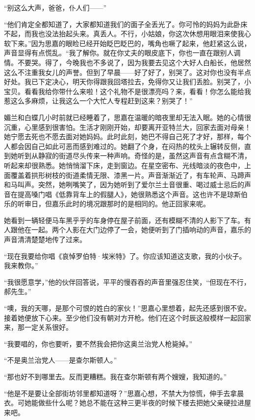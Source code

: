 \par “别这么大声，爸爸，仆人们——”
\par “他们肯定全都知道了，大家都知道我们的面子全丢光了。你可怜的妈妈为此卧床不起，而我也没法抬起头来。真丢人。不行，小姑娘，你这次休想用眼泪来使我心软下来。”因为思嘉的眼睑已经开始眨巴眨巴的，嘴角也噘了起来，他赶紧这么说，声音显得有点慌乱。“我了解你。就在你丈夫的眼皮底下，你也一直在跟别人调情。不要哭。得了，今晚我也不多说了，因为我要去见这个大好人白船长，他居然这么不注重我女儿的声誉。但到了早晨——好了好了，别哭了。这对你也没有半点好处。我已下定决心，明天你得跟我回塔拉去，免得你又让我们丢脸。别哭了，小宝贝。看看我给你带什么来啦！这个礼物不是很漂亮吗？来，看看！你怎么能给我惹这么多麻烦，让我这么一个大忙人专程赶到这来？别哭了！”
\par 
\par 媚兰和白蝶几小时前就已经睡着了，思嘉在温暖的暗夜里却无法入眠。她的心情很沉重，心里感到很害怕。生活才刚刚开始，却要离开亚特兰大，回家去面对母亲！她宁愿去死也不愿去面对她妈妈。此时此刻，她巴不得自己死了才好，那样，每个人都会因自己如此可恶而感到难过的。她翻了个身，在闷热的枕头上辗转反侧，直到她听到从静寂的街道尽头传来一种声响。奇怪的是，虽然这声音有点含糊不清，听起来却很熟悉。她悄悄溜下床，走到窗边。在星空密布、光线暗淡的夜色中，上面覆盖着拱形树枝的街道柔情无限、漆黑一片。声音渐渐近了，有车轮声、马蹄声和马叫声。突然，她咧嘴笑了，因为她听到了爱尔兰土音很重、喝过威士忌后的声音在提高嗓门唱《低靠背车上的假腿人》，她很熟悉这个声音。这也许不是琼斯伯乐的听审日，但嘉乐此时的境况跟那时的是相同的。他正回家来呢。
\par 她看到一辆轻便马车黑乎乎的车身停在屋子前面，还有模糊不清的人影下了车。有人跟他在一起。两个人影在大门边停了一会，她便听到了门插响动的声音，嘉乐的声音清清楚楚地传了过来。
\par “现在我要给你唱《哀悼罗伯特·埃米特》了。你应该知道这支歌，我的小伙子。我来教你。”
\par “我很愿意学，”他的伙伴回答说，平平的慢吞吞的声音里强忍住笑，“但现在不行，郝先生。”
\par “噢，我的天哪，是那个可恨的姓白的家伙！”思嘉心里想着，起先还感到很不安。接着她便放下心来。至少他们没有朝对方开枪。他们在这个时辰这般模样一起回家来，那一定关系很好。
\par “我要唱的，你也要听，要不然我会把你这奥兰治党人枪毙掉。”
\par “不是奥兰治党人——是查尔斯顿人。”
\par “那也好不到哪里去。反而更糟糕。我在查尔斯顿有两个嫂嫂，我知道的。”
\par “他是不是要让全部街坊邻里都知道呀？”思嘉心想，不禁大为惊慌，伸手去拿晨衣。可她能做些什么呢？她总不能在这种三更半夜的时候下楼去把她父亲硬拉进屋来吧。
